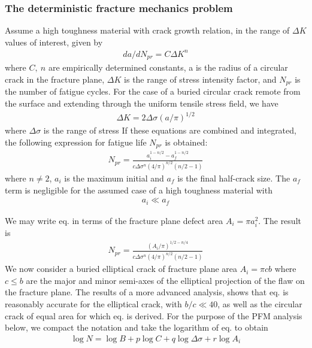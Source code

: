 \documentclass[12pt]{article}
\begin{document}
\subsubsection{The deterministic fracture mechanics problem}
Assume a high toughness material with crack
growth relation, in the range of $\Delta K$ values of interest,
given by
\begin{align*}
    da/dN_{pr} = C\Delta K ^ n
\end{align*}
where $C,\ n$ are empirically determined constants, a is
the radius of a circular crack in the fracture plane,
$\Delta K$ is the range of stress intensity factor, and $N_{pr}$ is
the number of fatigue cycles.
For the case of a buried circular crack remote from
the surface and extending through the uniform tensile
stress field, we have
\begin{align*}
    \Delta K = 2 \Delta \sigma (a / \pi)^{1/2}
\end{align*}
where $\Delta \sigma$ is the range of stress
If these equations are combined and integrated,
the following expression for fatigue life $N_{pr}$ is obtained:
\begin{align*}
    N_{pr} = \frac{a_{i}^{1 - n/2}-a_{f}^{1 - n/2}}{c \Delta \sigma^n(4/\pi)^{n/2}(n/2 - 1)}
\end{align*}
where $n \neq 2$, $a_i$ is the maximum initial and $a_{f}$ is the
final half-crack size. The $a_f$ term is negligible for the
assumed case of a high toughness material with
\begin{align*}
    a_i \ll a_f
\end{align*}

We may write eq. in terms of the fracture plane
defect area $A_i = \pi a_i^2$. The result is
\begin{align*}
    N_{pr} = \frac{(A_i/\pi)^{1/2 - n/4}}{c \Delta \sigma^n(4/\pi)^{n/2}(n/2 - 1)}
\end{align*}
We now consider a buried elliptical crack of
fracture plane area $A_i = \pi c b$ where $c \leq b$ are the major
and minor semi-axes of the elliptical projection of the
flaw on the fracture plane. The results of a more 
advanced analysis, shows
that eq. is reasonably accurate for the elliptical
crack, with $b/c \ll 40$, as well as the circular crack of
equal area for which eq. is derived.
For the purpose of the PFM analysis below, we
compact the notation and take the logarithm of eq. to obtain
\begin{align*}
    \log N = \log B+ p\log C+ q\log \Delta \sigma + r \log A_i
\end{align*}
\end{document}
